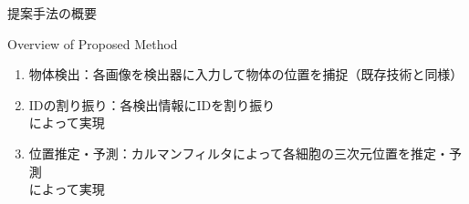 \begin{frame}{提案手法の概要}
    \small
    \begin{block}{Overview of Proposed Method}
        \begin{enumerate}
            \item 物体検出：各画像を検出器に入力して物体の位置を捕捉（既存技術と同様）
            \item IDの割り振り：各検出情報にIDを割り振り
            \\\ra \textbf{}によって実現
            \item 位置推定・予測：カルマンフィルタによって各細胞の三次元位置を推定・予測
            \\\ra \textbf{}によって実現
        \end{enumerate}
    \end{block}
\end{frame}

